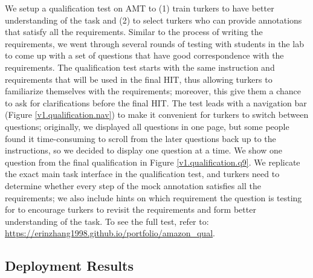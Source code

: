 We setup a qualification test on AMT to (1) train turkers to have better understanding of the task and (2) to select turkers who can provide annotations that satisfy all the requirements. Similar to the process of writing the requirements, we went through several rounds of testing with students in the lab to come up with a set of questions that have good correspondence with the requirements. The qualification test starts with the same instruction and requirements that will be used in the final HIT, thus allowing turkers to familiarize themselves with the requirements; moreover, this give them a chance to ask for clarifications before the final HIT. The test leads with a navigation bar (Figure \ref{v1.qualification.nav}) to make it convenient for turkers to switch between questions; originally, we displayed all questions in one page, but some people found it time-consuming to scroll from the later questions back up to the instructions, so we decided to display one question at a time. 
We show one question from the final qualification in Figure \ref{v1.qualification.q9}. We replicate the exact main task interface in the qualification test, and turkers need to determine whether every step of the mock annotation satisfies all the requirements; we also include hints on which requirement the question is testing for to encourage turkers to revisit the requirements and form better understanding of the task.  
To see the full test, refer to: \url{https://erinzhang1998.github.io/portfolio/amazon_qual}.


\subsection{Deployment Results}


